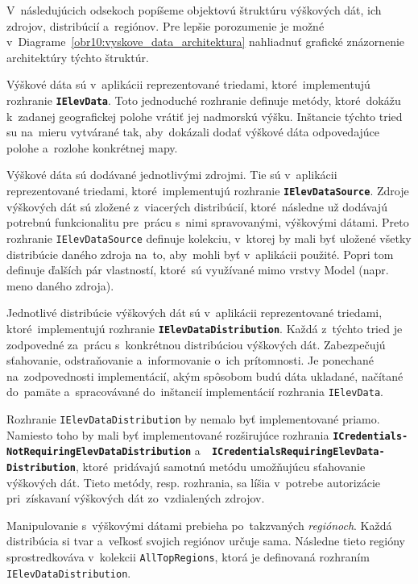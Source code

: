 V~následujúcich odsekoch popíšeme objektovú štruktúru výškových dát, ich zdrojov, distribúcií a~regiónov. Pre lepšie porozumenie je možné v~Diagrame~\ref{obr10:vyskove_data_architektura} nahliadnuť grafické znázornenie architektúry týchto štruktúr.   

\bigskip

Výškové dáta sú v~aplikácii reprezentované triedami, ktoré~implementujú rozhranie \textbf{\texttt{IElevData}}. Toto jednoduché rozhranie definuje metódy, ktoré~dokážu k~zadanej geografickej polohe vrátiť jej nadmorskú výšku. Inštancie týchto tried su na~mieru vytvárané tak, aby~dokázali dodať výškové dáta odpovedajúce polohe a~rozlohe konkrétnej mapy. 

Výškové dáta sú dodávané jednotlivými zdrojmi. Tie sú v~aplikácii reprezentované triedami, ktoré~implementujú rozhranie \textbf{\texttt{IElevDataSource}}. Zdroje výškových dát sú zložené z~viacerých distribúcií, ktoré~následne už dodávajú potrebnú funkcionalitu pre~prácu s~nimi spravovanými, výškovými dátami. Preto rozhranie \texttt{IElevDataSource} definuje kolekciu, v~ktorej by mali byť uložené všetky distribúcie daného zdroja na~to, aby~mohli byť v~aplikácii použité. Popri tom definuje ďalších pár vlastností, ktoré~sú využívané mimo vrstvy Model (napr. meno daného zdroja).

Jednotlivé distribúcie výškových dát sú v~aplikácii reprezentované triedami, ktoré~implementujú rozhranie \textbf{\texttt{IElevDataDistribution}}. Každá z~týchto tried je zodpovedné za~prácu s~konkrétnou distribúciou výškových dát. Zabezpečujú sťahovanie, odstraňovanie a~informovanie o~ich prítomnosti. Je ponechané na~zodpovednosti implementácií, akým spôsobom budú dáta ukladané, načítané do~pamäte a~spracovávané do~inštancií implementácií rozhrania \texttt{IElevData}.

Rozhranie \texttt{IElevDataDistribution} by nemalo byť implementované priamo. Namiesto toho by mali byť implementované rozširujúce rozhrania \textbf{\texttt{ICredentials-} \texttt{NotRequiringElevDataDistribution}} a~\textbf{\texttt{ ICredentialsRequiringElevData- } \texttt{Distribution}},  ktoré~pridávajú samotnú metódu umožňujúcu sťahovanie výškových dát. Tieto metódy, resp. rozhrania, sa líšia v~potrebe autorizácie pri~získavaní výškových dát zo~vzdialených zdrojov.  

Manipulovanie s~výškovými dátami prebieha po~takzvaných \textit{regiónoch}. Každá distribúcia si tvar a~veľkosť svojich regiónov určuje sama. Následne tieto regióny sprostredkováva v~kolekcii \texttt{AllTopRegions}, ktorá je definovaná rozhraním \texttt{IElevDataDistribution}.

